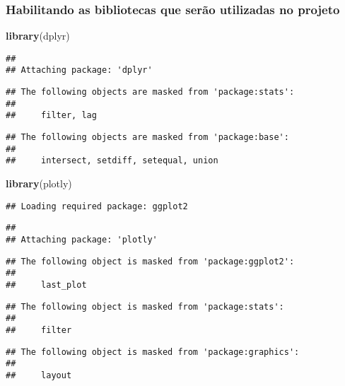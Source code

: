 \documentclass[
]{article}
\newenvironment{Shaded}{\begin{snugshade}}{\end{snugshade}}
\newcommand{\KeywordTok}[1]{\textcolor[rgb]{0.13,0.29,0.53}{\textbf{#1}}}
\newcommand{\NormalTok}[1]{#1}
\begin{document}
\hypertarget{habilitando-as-bibliotecas-que-seruxe3o-utilizadas-no-projeto}{%
\subsubsection{Habilitando as bibliotecas que serão utilizadas no
projeto}\label{habilitando-as-bibliotecas-que-seruxe3o-utilizadas-no-projeto}}

\begin{Shaded}
\begin{Highlighting}[]
\KeywordTok{library}\NormalTok{(dplyr)}
\end{Highlighting}
\end{Shaded}

\begin{verbatim}
## 
## Attaching package: 'dplyr'
\end{verbatim}

\begin{verbatim}
## The following objects are masked from 'package:stats':
## 
##     filter, lag
\end{verbatim}

\begin{verbatim}
## The following objects are masked from 'package:base':
## 
##     intersect, setdiff, setequal, union
\end{verbatim}

\begin{Shaded}
\begin{Highlighting}[]
\KeywordTok{library}\NormalTok{(plotly)}
\end{Highlighting}
\end{Shaded}

\begin{verbatim}
## Loading required package: ggplot2
\end{verbatim}

\begin{verbatim}
## 
## Attaching package: 'plotly'
\end{verbatim}

\begin{verbatim}
## The following object is masked from 'package:ggplot2':
## 
##     last_plot
\end{verbatim}

\begin{verbatim}
## The following object is masked from 'package:stats':
## 
##     filter
\end{verbatim}

\begin{verbatim}
## The following object is masked from 'package:graphics':
## 
##     layout
\end{verbatim}
\end{document}
